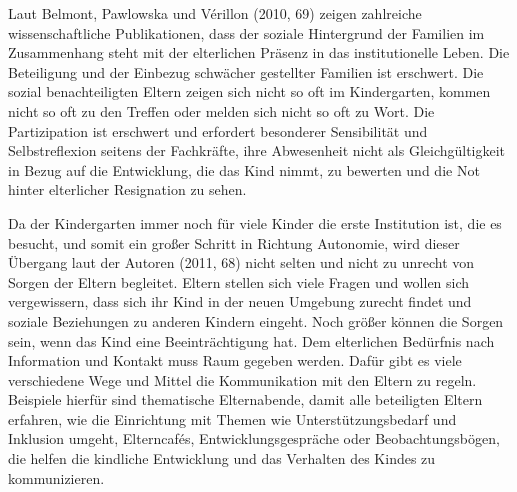 Laut Belmont, Pawlowska  und Vérillon (2010, 69) zeigen zahlreiche wissenschaftliche Publikationen, dass der soziale Hintergrund der Familien im Zusammenhang steht mit der elterlichen Präsenz in das institutionelle Leben. Die Beteiligung und der Einbezug schwächer gestellter Familien ist erschwert. Die sozial benachteiligten Eltern zeigen sich nicht so oft im Kindergarten, kommen nicht so oft zu den Treffen oder melden sich nicht so oft zu Wort. Die Partizipation ist erschwert und erfordert besonderer Sensibilität und Selbstreflexion seitens der Fachkräfte, ihre Abwesenheit nicht als Gleichgültigkeit in Bezug auf die Entwicklung, die das Kind nimmt, zu bewerten und die Not hinter elterlicher Resignation zu sehen.

Da der Kindergarten immer noch für viele Kinder die erste Institution ist, die es besucht, und somit ein großer Schritt in Richtung Autonomie, wird dieser Übergang laut der Autoren (2011, 68) nicht selten und nicht zu unrecht von Sorgen der Eltern begleitet. Eltern stellen sich viele Fragen und wollen sich vergewissern, dass sich ihr Kind in der neuen Umgebung zurecht findet und soziale Beziehungen zu anderen Kindern eingeht. Noch größer können die Sorgen sein, wenn das Kind eine Beeinträchtigung hat. Dem elterlichen Bedürfnis nach Information und Kontakt muss Raum gegeben werden. Dafür gibt es viele verschiedene Wege und Mittel die Kommunikation mit den Eltern zu regeln. Beispiele hierfür sind thematische Elternabende, damit alle beteiligten Eltern erfahren, wie die Einrichtung mit Themen wie  Unterstützungsbedarf und Inklusion umgeht, Elterncafés,  Entwicklungsgespräche oder Beobachtungsbögen, die helfen die kindliche Entwicklung und das Verhalten des Kindes zu kommunizieren.
  
